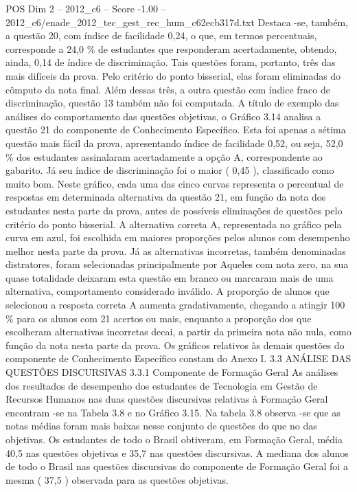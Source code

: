 \begin{textsample}{POS Dim 2 – 2012\_c6 – Score -1.00 – 2012\_c6/enade\_2012\_tec\_gest\_rec\_hum\_c62ecb317d.txt}
Destaca -se, também, a questão 20, com índice de facilidade 0,24, o que, em termos percentuais, corresponde a 24,0 \% de estudantes que responderam acertadamente, obtendo, ainda, 0,14 de índice de discriminação.
Tais questões foram, portanto, três das mais difíceis da prova.
Pelo critério do ponto bisserial, elas foram eliminadas do cômputo da nota final.
Além dessas três, a outra questão com índice fraco de discriminação, questão 13 também não foi computada.
A título de exemplo das análises do comportamento das questões objetivas, o Gráfico 3.14 analisa a questão 21 do componente de Conhecimento Específico.
Esta foi apenas a sétima questão mais fácil da prova, apresentando índice de facilidade 0,52, ou seja, 52,0 \% dos estudantes assinalaram acertadamente a opção A, correspondente ao gabarito.
Já seu índice de discriminação foi o maior ( 0,45 ), classificado como muito bom.
Neste gráfico, cada uma das cinco curvas representa o percentual de respostas em determinada alternativa da questão 21, em função da nota dos estudantes nesta parte da prova, antes de possíveis eliminações de questões pelo critério do ponto bisserial.
A alternativa correta A, representada no gráfico pela curva em azul, foi escolhida em maiores proporções pelos alunos com desempenho melhor nesta parte da prova.
Já as alternativas incorretas, também denominadas distratores, foram selecionadas principalmente por Aqueles com nota zero, na sua quase totalidade deixaram esta questão em branco ou marcaram mais de uma alternativa, comportamento considerado inválido.
A proporção de alunos que selecionou a resposta correta A aumenta gradativamente, chegando a atingir 100 \% para os alunos com 21 acertos ou mais, enquanto a proporção dos que escolheram alternativas incorretas decai, a partir da primeira nota não nula, como função da nota nesta parte da prova.
Os gráficos relativos às demais questões do componente de Conhecimento Específico constam do Anexo I. 3.3 ANÁLISE DAS QUESTÕES DISCURSIVAS 3.3.1 Componente de Formação Geral As análises dos resultados de desempenho dos estudantes de Tecnologia em Gestão de Recursos Humanos nas duas questões discursivas relativas à Formação Geral encontram -se na Tabela 3.8 e no Gráfico 3.15.
Na tabela 3.8 observa -se que as notas médias foram mais baixas nesse conjunto de questões do que no das objetivas.
Os estudantes de todo o Brasil obtiveram, em Formação Geral, média 40,5 nas questões objetivas e 35,7 nas questões discursivas.
A mediana dos alunos de todo o Brasil nas questões discursivas do componente de Formação Geral foi a mesma ( 37,5 ) observada para as questões objetivas.

\end{textsample}
